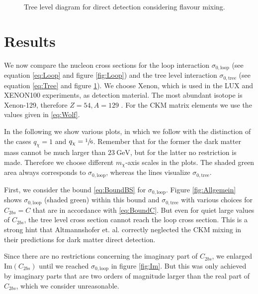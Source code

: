 \begin{figure}
	\centering
	
	\caption{Tree level diagram for direct detection considering flavour mixing.}
	\label{fig:Tree}
\end{figure}

\section{Results}
We now compare the nucleon cross sections for the loop interaction $\sigma_{0,\text{loop}}$ (see equation \eqref{eq:Loop} and figure \ref{fig:Loop}) and the tree level interaction $\sigma_{0,\text{tree}}$ (see equation \eqref{eq:Tree} and figure \ref{fig:Tree}). We choose Xenon, which is used in the LUX and XENON100 experiments, as detection material. The most abundant isotope is Xenon-129, therefore $Z = 54, A=129$ \cite{DD}. For the CKM matrix elements we use the values given in \eqref{eq:Wolf}.


In the following we show various plots, in which we follow \cite{Z} with the distinction of the cases $q_\chi= 1$ and $q_\chi=\sfrac{1}{6}$. Remember that for the former the dark matter mass cannot be much larger than $\SI{23}{\giga\electronvolt}$, but for the latter no restriction is made. Therefore we choose different $m_\chi$-axis scales in the plots. The shaded green area always corresponds to $\sigma_{0,\text{loop}}$, whereas the lines visualize $\sigma_{0,\text{tree}}$.


First, we consider the bound \eqref{eq:BoundBS} for $\sigma_{0,\text{loop}}$. Figure \ref{fig:Allgemein} shows $\sigma_{0,\text{loop}}$ (shaded green) within this bound and $\sigma_{0,\text{tree}}$ with various choices for $C_{2bs} = C$ that are in accordance with \eqref{eq:BoundC}. But even for quiet large values of $C_{2bs}$, the tree level cross section cannot reach the loop cross section. This is a strong hint that Altmannshofer et. al. correctly neglected the CKM mixing in their predictions for dark matter direct detection.


Since there are no restrictions concerning the imaginary part of $C_{2bs}$, we enlarged $\text{Im}(C_{2bs})$ until we reached $\sigma_{0,\text{loop}}$ in figure \ref{fig:Im}. But this was only achieved by imaginary parts that are two orders of magnitude larger than the real part of $C_{2bs}$, which we consider unreasonable.


